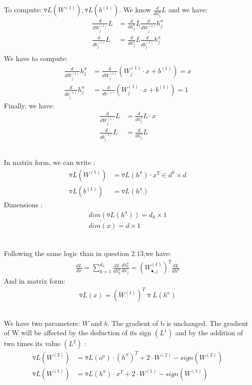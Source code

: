 \documentclass[12pt]{article}
\begin{document}
\subsection{}
To compute: $\triangledown L(W^{(1)}), \triangledown L(b^{(1)})$.
We know $\frac{d}{dh^a_j} L$ and we have:
\begin{align*}
\frac{d}{dW^{(1)}_j} L &= \frac{d}{dh^a_j} L \frac{d}{dW^{(1)}_j} h^a_j \\
\frac{d}{db^{(1)}_j} L &= \frac{d}{dh^a_j} L \frac{d}{db^{(1)}_j} h^a_j \\
\end{align*}
We have to compute:
\begin{align*}
\frac{d}{dW^{(1)}_j} h^a_j & = \frac{d}{dW^{(1)}_j} (W^{(1)}_j \cdot x + b^{(1)}) = x \\
\frac{d}{db^{(1)}_{j}} h^a_j &= \frac{d}{db^{(1)}} (W^{(1)}_{j} \cdot x + b^{(1)}) = 1
\end{align*}
Finally, we have:
\begin{align*}
\frac{d}{dW^{(1)}_j} L &= \frac{d}{dh^a_j} L \cdot x\\
\frac{d}{db^{(1)}_j} L &= \frac{d}{dh^a_j} L
\end{align*}
\subsection{}
In matrix form, we can write :
\begin{align*}
\triangledown L(W^{(1)})  & =  \triangledown L(h^a) \cdot x^T \in d^h \times d\\
\triangledown L(b^{(1)})  & = \triangledown L(h^a) 
\end{align*}
Dimensions :
\begin{align*}
dim(\triangledown L(h^a)) = d_h \times 1 \\
dim(x) = d \times 1 \\
\end{align*}
\subsection{}
Following the same logic than in question 2.13,we have:
\begin{align*}
\frac{dL}{dx} = \sum\limits_{k=1}^{d_h} \frac{dL}{dh^a_k} \frac{dh^a_k}{dx_j} = (W^{(1)}_{\bullet,j})^T \frac{dL}{dh^a}
\end{align*}
And in matrix form:
\begin{align*}
\triangledown L(x) = (W^{(1)})^T \triangledown L (h^a)
\end{align*}
\subsection{}
We have two parameters: $W$ and $b$. The gradient of b is unchanged. The gradient of W will be affected by the deduction of its sign $(L^1)$ and by the addition of two times its value $(L^2)$ :
\begin{align*} 
\triangledown L(W^{(2)}) & = \triangledown L(o^a) \cdot (h^S)^T + 2 \cdot W^{(2)} - sign(W^{(2)}) \\
\triangledown L(W^{(1)}) & = \triangledown L(h^a) \cdot x^T + 2 \cdot W^{(1)} - sign(W^{(1)}) \\
\end{align*}
\end{document}
